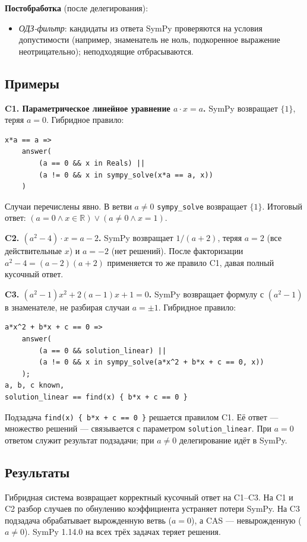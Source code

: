 \textbf{Постобработка} (после делегирования):

\begin{itemize}
  \item \emph{ОДЗ-фильтр}: кандидаты из ответа SymPy проверяются на 
    условия допустимости (например, знаменатель не ноль, подкоренное 
    выражение неотрицательно); неподходящие отбрасываются.
\end{itemize}

\subsection{Примеры}

\textbf{C1. Параметрическое линейное уравнение $a \cdot x = a$.}  
SymPy возвращает $\{1\}$, теряя $a = 0$. Гибридное правило:

\begin{lstlisting}
x*a == a =>
    answer(
        (a == 0 && x in Reals) ||
        (a != 0 && x in sympy_solve(x*a == a, x))
    )
\end{lstlisting}

Случаи перечислены явно. В ветви $a \neq 0$ \texttt{sympy\_solve} 
возвращает $\{1\}$. Итоговый ответ: 
$(a = 0 \wedge x \in \mathbb{R}) \vee (a \neq 0 \wedge x = 1)$.

\textbf{C2. $(a^2-4) \cdot x = a-2$.}  
SymPy возвращает $1/(a+2)$, теряя $a = 2$ (все действительные $x$) 
и $a = -2$ (нет решений). После факторизации $a^2-4 = (a-2)(a+2)$ 
применяется то же правило C1, давая полный кусочный ответ.

\textbf{C3. $(a^2-1)x^2 + 2(a-1)x + 1 = 0$.}  
SymPy возвращает формулу с $(a^2-1)$ в знаменателе, не разбирая случаи 
$a = \pm 1$. Гибридное правило:

\begin{lstlisting}
a*x^2 + b*x + c == 0 =>
    answer(
        (a == 0 && solution_linear) ||
        (a != 0 && x in sympy_solve(a*x^2 + b*x + c == 0, x))
    );
a, b, c known,
solution_linear == find(x) { b*x + c == 0 }
\end{lstlisting}

Подзадача \texttt{find(x) \{ b*x + c == 0 \}} решается правилом C1. 
Её ответ --- множество решений --- связывается с параметром 
\texttt{solution\_linear}. При $a = 0$ ответом служит результат 
подзадачи; при $a \neq 0$ делегирование идёт в SymPy.

\subsection{Результаты}

Гибридная система возвращает корректный кусочный ответ на C1--C3. 
На C1 и C2 разбор случаев по обнулению коэффициента устраняет потери SymPy. 
На C3 подзадача обрабатывает вырожденную ветвь ($a=0$), а CAS --- 
невырожденную ($a \neq 0$). SymPy 1.14.0 на всех трёх задачах теряет 
решения.